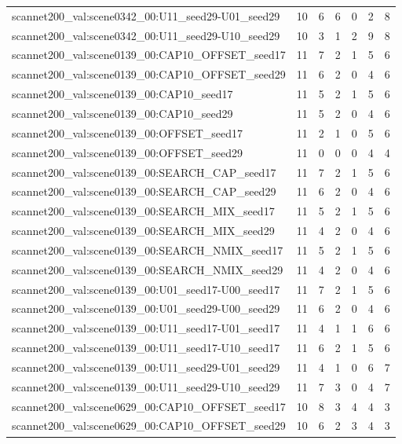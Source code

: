 \begin{table}[t]
\begin{tabular}{lrrrrrr}
scannet200\_val:scene0342\_00:U11\_seed29-U01\_seed29 & 10 & 6 & 6 & 0 & 2 & 8 \\
scannet200\_val:scene0342\_00:U11\_seed29-U10\_seed29 & 10 & 3 & 1 & 2 & 9 & 8 \\
scannet200\_val:scene0139\_00:CAP10\_OFFSET\_seed17 & 11 & 7 & 2 & 1 & 5 & 6 \\
scannet200\_val:scene0139\_00:CAP10\_OFFSET\_seed29 & 11 & 6 & 2 & 0 & 4 & 6 \\
scannet200\_val:scene0139\_00:CAP10\_seed17 & 11 & 5 & 2 & 1 & 5 & 6 \\
scannet200\_val:scene0139\_00:CAP10\_seed29 & 11 & 5 & 2 & 0 & 4 & 6 \\
scannet200\_val:scene0139\_00:OFFSET\_seed17 & 11 & 2 & 1 & 0 & 5 & 6 \\
scannet200\_val:scene0139\_00:OFFSET\_seed29 & 11 & 0 & 0 & 0 & 4 & 4 \\
scannet200\_val:scene0139\_00:SEARCH\_CAP\_seed17 & 11 & 7 & 2 & 1 & 5 & 6 \\
scannet200\_val:scene0139\_00:SEARCH\_CAP\_seed29 & 11 & 6 & 2 & 0 & 4 & 6 \\
scannet200\_val:scene0139\_00:SEARCH\_MIX\_seed17 & 11 & 5 & 2 & 1 & 5 & 6 \\
scannet200\_val:scene0139\_00:SEARCH\_MIX\_seed29 & 11 & 4 & 2 & 0 & 4 & 6 \\
scannet200\_val:scene0139\_00:SEARCH\_NMIX\_seed17 & 11 & 5 & 2 & 1 & 5 & 6 \\
scannet200\_val:scene0139\_00:SEARCH\_NMIX\_seed29 & 11 & 4 & 2 & 0 & 4 & 6 \\
scannet200\_val:scene0139\_00:U01\_seed17-U00\_seed17 & 11 & 7 & 2 & 1 & 5 & 6 \\
scannet200\_val:scene0139\_00:U01\_seed29-U00\_seed29 & 11 & 6 & 2 & 0 & 4 & 6 \\
scannet200\_val:scene0139\_00:U11\_seed17-U01\_seed17 & 11 & 4 & 1 & 1 & 6 & 6 \\
scannet200\_val:scene0139\_00:U11\_seed17-U10\_seed17 & 11 & 6 & 2 & 1 & 5 & 6 \\
scannet200\_val:scene0139\_00:U11\_seed29-U01\_seed29 & 11 & 4 & 1 & 0 & 6 & 7 \\
scannet200\_val:scene0139\_00:U11\_seed29-U10\_seed29 & 11 & 7 & 3 & 0 & 4 & 7 \\
scannet200\_val:scene0629\_00:CAP10\_OFFSET\_seed17 & 10 & 8 & 3 & 4 & 4 & 3 \\
scannet200\_val:scene0629\_00:CAP10\_OFFSET\_seed29 & 10 & 6 & 2 & 3 & 4 & 3 \\

\end{tabular}
\end{table}
